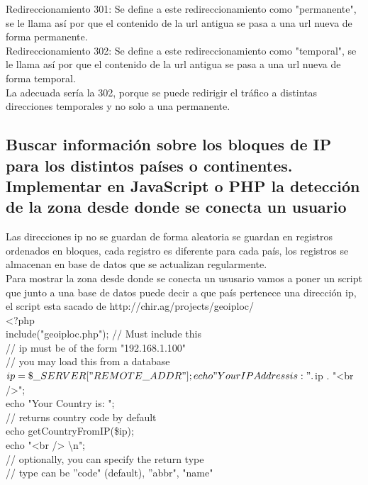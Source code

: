 Redireccionamiento 301: Se define a este redireccionamiento como "permanente", se le llama así por que el contenido de la url antigua se pasa a una url nueva de forma permanente.\\
Redireccionamiento 302: Se define a este redireccionamiento como "temporal", se le llama así por que el contenido de la url antigua se pasa a una url nueva de forma temporal.\\

La adecuada sería la 302, porque se puede redirigir el tráfico a distintas direcciones temporales y no solo a una permanente.\\

\subsection{ Buscar información sobre los bloques de IP para los distintos países o continentes. Implementar en JavaScript o PHP la detección de la zona desde donde se conecta un usuario }

Las direcciones ip no se guardan de forma aleatoria se guardan en registros ordenados en bloques, cada registro es diferente para cada país, los registros se almacenan en base de datos que se actualizan regularmente.\\
Para mostrar la zona desde donde se conecta un ususario vamos a poner un script que junto a una base de datos puede decir a que país pertenece una dirección ip, el script esta sacado de http://chir.ag/projects/geoiploc/ \\

<?php\\

  include("geoiploc.php"); // Must include this\\

  // ip must be of the form "192.168.1.100"\\
  // you may load this from a database\\
  $ip = \$\_SERVER["REMOTE\_ADDR"];\\
  echo "Your IP Address is: " . $ip . "<br />";\\

  echo "Your Country is: ";\\
  // returns country code by default\\
  echo getCountryFromIP(\$ip);\\
  echo "<br /> \textbackslash n";\\

  // optionally, you can specify the return type\\
  // type can be ''code" (default), ''abbr", "name"\\


